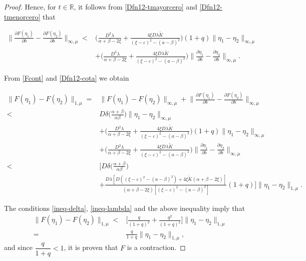 \documentclass[9pt]{amsart}
\numberwithin{equation}{section}
\numberwithin{lemma}{section}
\begin{document}
\begin{proof}
Hence, for $t\in\mathbb{R}$, it follows from \eqref{Dfn12-tmayorcero} and \eqref{Dfn12-tmenorcero} that 

\begin{align}
    \Big\|\frac{\partial F(\eta_1)}{\partial b} - \frac{\partial F(\eta_2)}{\partial b}\Big\|_{\infty,\mu} <& \Big(\frac{D^2\lambda}{\alpha+\beta-2\xi}+\frac{4\xi D\lambda\tilde{K}}{(\xi-\varepsilon)^2-(a-\beta)^2}\Big)(1+q)\|\eta_1-\eta_2\|_{\infty,\mu}\nonumber\\
    & + \Big(\frac{D^2\lambda}{\alpha+\beta-2\xi}+\frac{4\xi D\lambda\tilde{K}}{(\xi-\varepsilon)^2-(a-\beta)^2}\Big)\Big\|\frac{\partial \eta_1}{\partial b} - \frac{\partial\eta_2}{\partial b}\Big\|_{\infty,\mu}.\label{Dfn12-cota}
\end{align}

From \eqref{Fcont} and \eqref{Dfn12-cota} we obtain

\begin{align*}
    \|F(\eta_1)-F(\eta_2)\|_{1,\mu} = & \|F(\eta_1)-F(\eta_2)\|_{\infty,\mu} + \Big\|\frac{\partial F(\eta_1)}{\partial b} - \frac{\partial F(\eta_2)}{\partial b}\Big\|_{\infty,\mu}\nonumber\\
    <& D\delta\Big(\frac{\alpha+\beta}{\alpha\beta}\Big)\|\eta_1-\eta_2\|_{\infty,\mu}\nonumber\\
    &+ \Big(\frac{D^2\lambda}{\alpha+\beta-2\xi}+\frac{4\xi D\lambda\tilde{K}}{(\xi-\varepsilon)^2-(a-\beta)^2}\Big)(1+q)\|\eta_1-\eta_2\|_{\infty,\mu}\nonumber\\
    &+  \Big(\frac{D^2\lambda}{\alpha+\beta-2\xi}+\frac{4\xi D\lambda\tilde{K}}{(\xi-\varepsilon)^2-(a-\beta)^2}\Big)\Big\|\frac{\partial \eta_1}{\partial b} - \frac{\partial\eta_2}{\partial b}\Big\|_{\infty,\mu}\nonumber\\
    <& \Big[D\delta\Big(\frac{\alpha+\beta}{\alpha\beta}\Big)\nonumber\\
    &+ \frac{D\lambda[D((\xi-\varepsilon)^2-(a-\beta)^2)+4\xi\tilde{K}(\alpha+\beta-2\xi)]}{(\alpha+\beta-2\xi)[(\xi-\varepsilon)^2-(a-\beta)^2]}(1+q)\Big]\|\eta_1-\eta_2\|_{1,\mu}.
\end{align*}

The conditions \eqref{ineq-delta}, \eqref{ineq-lambda} and the above inequality imply that
\begin{align*}
   \|F(\eta_1)-F(\eta_2)\|_{1,\mu} < & \Big[\frac{q}{(1+q)^2}+\frac{q^2}{(1+q)^2}\Big]\|\eta_1-\eta_2\|_{1,\mu}\\
   =& \frac{q}{1+q}\|\eta_1-\eta_2\|_{1,\mu},
\end{align*}
 and since $\dfrac{q}{1+q}<1$, it is proven that $F$ is a contraction.
\end{proof}
\end{document}

